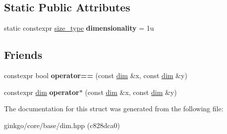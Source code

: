 \subsection*{Static Public Attributes}
\begin{DoxyCompactItemize}
\item 
\mbox{\label{structgko_1_1dim_3_011u_00_01DimensionType_01_4_af991219c5c0f3b362f205a239767f3a3}} 
static constexpr \hyperlink{namespacegko_a6e5c95df0ae4e47aab2f604a22d98ee7}{size\+\_\+type} {\bfseries dimensionality} = 1u
\end{DoxyCompactItemize}
\subsection*{Friends}
\begin{DoxyCompactItemize}
\item 
\mbox{\label{structgko_1_1dim_3_011u_00_01DimensionType_01_4_a5e2c1e99f1c12540aac8489127c5dfb6}} 
constexpr bool {\bfseries operator==} (const \hyperlink{structgko_1_1dim}{dim} \&x, const \hyperlink{structgko_1_1dim}{dim} \&y)
\item 
\mbox{\label{structgko_1_1dim_3_011u_00_01DimensionType_01_4_a27d25e410396817b4ceafbae3d5df5c8}} 
constexpr \hyperlink{structgko_1_1dim}{dim} {\bfseries operator$\ast$} (const \hyperlink{structgko_1_1dim}{dim} \&x, const \hyperlink{structgko_1_1dim}{dim} \&y)
\end{DoxyCompactItemize}


The documentation for this struct was generated from the following file\+:\begin{DoxyCompactItemize}
\item 
ginkgo/core/base/dim.\+hpp (c828dca0)\end{DoxyCompactItemize}
